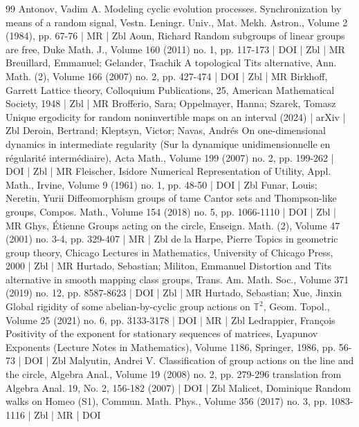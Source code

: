 \begin{thebibliography}{99}
 Antonov, Vadim A. Modeling cyclic evolution processes. Synchronization by means of a random signal, Vestn. Leningr. Univ., Mat. Mekh. Astron., Volume 2 (1984), pp. 67-76 | MR | Zbl
 Aoun, Richard Random subgroups of linear groups are free, Duke Math. J., Volume 160 (2011) no. 1, pp. 117-173 | DOI | Zbl | MR
 Breuillard, Emmanuel; Gelander, Tsachik A topological Tits alternative, Ann. Math. (2), Volume 166 (2007) no. 2, pp. 427-474 | DOI | Zbl | MR
 Birkhoff, Garrett Lattice theory, Colloquium Publications, 25, American Mathematical Society, 1948 | Zbl | MR
 Brofferio, Sara; Oppelmayer, Hanna; Szarek, Tomasz Unique ergodicity for random noninvertible maps on an interval (2024) | arXiv | Zbl
 Deroin, Bertrand; Kleptsyn, Victor; Navas, Andrés On one-dimensional dynamics in intermediate regularity (Sur la dynamique unidimensionnelle en régularité intermédiaire), Acta Math., Volume 199 (2007) no. 2, pp. 199-262 | DOI | Zbl | MR
 Fleischer, Isidore Numerical Representation of Utility, Appl. Math., Irvine, Volume 9 (1961) no. 1, pp. 48-50 | DOI | Zbl
 Funar, Louis; Neretin, Yurii Diffeomorphism groups of tame Cantor sets and Thompson-like groups, Compos. Math., Volume 154 (2018) no. 5, pp. 1066-1110 | DOI | Zbl | MR
 Ghys, Étienne Groups acting on the circle, Enseign. Math. (2), Volume 47 (2001) no. 3-4, pp. 329-407 | MR | Zbl
 de la Harpe, Pierre Topics in geometric group theory, Chicago Lectures in Mathematics, University of Chicago Press, 2000 | Zbl | MR
 Hurtado, Sebastian; Militon, Emmanuel Distortion and Tits alternative in smooth mapping class groups, Trans. Am. Math. Soc., Volume 371 (2019) no. 12, pp. 8587-8623 | DOI | Zbl | MR
 Hurtado, Sebastian; Xue, Jinxin Global rigidity of some abelian-by-cyclic group actions on $\mathbb{T}^2$, Geom. Topol., Volume 25 (2021) no. 6, pp. 3133-3178 | DOI | MR | Zbl
 Ledrappier, François Positivity of the exponent for stationary sequences of matrices, Lyapunov Exponents (Lecture Notes in Mathematics), Volume 1186, Springer, 1986, pp. 56-73 | DOI | Zbl
 Malyutin, Andrei V. Classification of group actions on the line and the circle, Algebra Anal., Volume 19 (2008) no. 2, pp. 279-296 translation from Algebra Anal. 19, No. 2, 156-182 (2007) | DOI | Zbl
 Malicet, Dominique Random walks on Homeo (S1), Commun. Math. Phys., Volume 356 (2017) no. 3, pp. 1083-1116 | Zbl | MR | DOI

\end{thebibliography}
